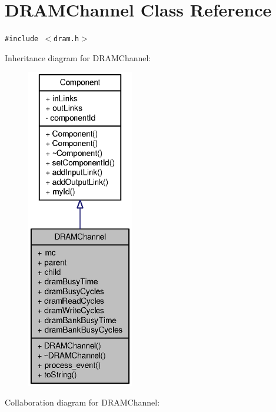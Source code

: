 \section{DRAMChannel Class Reference}
\label{classDRAMChannel}
{\tt \#include $<$dram.h$>$}

Inheritance diagram for DRAMChannel:\nopagebreak
\begin{figure}[H]
\begin{center}
\leavevmode
\includegraphics[height=400pt]{classDRAMChannel__inherit__graph}
\end{center}
\end{figure}
Collaboration diagram for DRAMChannel:\nopagebreak
